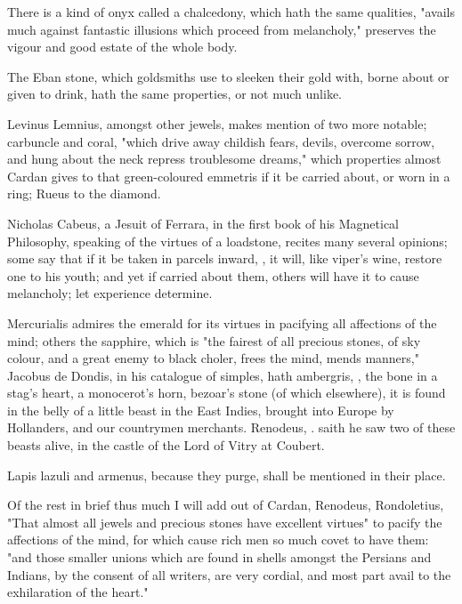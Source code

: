 {There is a kind of onyx called a chalcedony, which hath the same qualities, "avails much against fantastic illusions which proceed from melancholy," preserves the vigour and good estate of the whole body.

The Eban stone, which goldsmiths use to sleeken their gold with, borne about or given to drink, hath the same properties, or not much unlike.

Levinus Lemnius,  amongst other jewels, makes mention of two more notable; carbuncle and coral, "which drive away childish fears, devils, overcome sorrow, and hung about the neck repress troublesome dreams," which properties almost Cardan gives to that green-coloured emmetris if it be carried about, or worn in a ring; Rueus to the diamond.

Nicholas Cabeus, a Jesuit of Ferrara, in the first book of his Magnetical Philosophy,  speaking of the virtues of a loadstone, recites many several opinions; some say that if it be taken in parcels inward, , it will, like viper's wine, restore one to his youth; and yet if carried about them, others will have it to cause melancholy; let experience determine.

Mercurialis admires the emerald for its virtues in pacifying all affections of the mind; others the sapphire, which is "the fairest of all precious stones, of sky colour, and a great enemy to black choler, frees the mind, mends manners," \etc{} Jacobus de Dondis, in his catalogue of simples, hath ambergris, , the bone in a stag's heart, a monocerot's horn, bezoar's stone (of which elsewhere), it is found in the belly of a little beast in the East Indies, brought into Europe by Hollanders, and our countrymen merchants. Renodeus, . saith he saw two of these beasts alive, in the castle of the Lord of Vitry at Coubert.

Lapis lazuli and armenus, because they purge, shall be mentioned in their place.

Of the rest in brief thus much I will add out of Cardan, Renodeus,  Rondoletius,  "That almost all jewels and precious stones have excellent virtues" to pacify the affections of the mind, for which cause rich men so much covet to have them: "and those smaller unions which are found in shells amongst the Persians and Indians, by the consent of all writers, are very cordial, and most part avail to the exhilaration of the heart."

}
